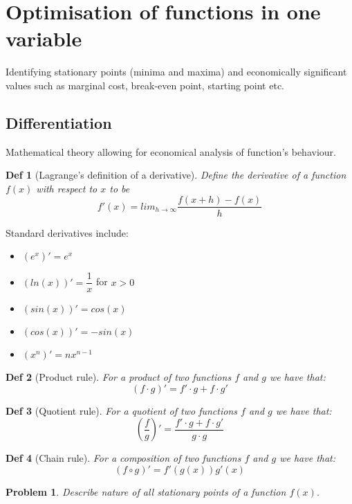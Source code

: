 \documentclass[11pt,a4paper, margin]{article}
\theoremstyle{break}
\newtheorem*{problem}{Problem}
\theoremstyle{break}
\newtheorem*{definition}{Def}
\begin{document}
\section{Optimisation of functions in one variable}
Identifying stationary points (minima and maxima) and economically significant values such as marginal cost, break-even point, starting point etc.

\subsection{Differentiation}
Mathematical theory allowing for economical analysis of function's behaviour.

\begin{definition}[Lagrange's definition of a derivative]
Define the derivative of a function $f(x)$ with respect to $x$ to be 
\[f'(x) = lim_{h \rightarrow \infty} \dfrac{f(x+h) - f(x)}{h}\]
\end{definition}

Standard derivatives include:
\begin{itemize}
	\item $(e^x)'=e^x$
	\item $(ln(x))'=\dfrac{1}{x}$ for $x > 0$
	\item $(sin(x))'=cos(x)$
	\item $(cos(x))'=-sin(x)$
	\item $(x^n)'=nx^{n-1}$
\end{itemize}

\begin{definition}[Product rule]
For a product of two functions $f$ and $g$ we have that:
\[(f\cdot g)'=f'\cdot g + f\cdot g'\]
\end{definition}

\begin{definition}[Quotient rule]
For a quotient of two functions $f$ and $g$ we have that:
\[(\dfrac{f}{g})'=\dfrac{f'\cdot g + f\cdot g'}{g \cdot g}\]
\end{definition}

\begin{definition}[Chain rule]
For a composition of two functions $f$ and $g$ we have that:
\[(f \circ g)' = f'(g(x))g'(x)\]
\end{definition}

\begin{problem}
Describe nature of all stationary points of a function $f(x)$.
\end{problem}
\end{document}
